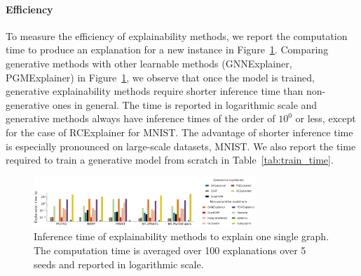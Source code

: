 \paragraph{Efficiency} To measure the efficiency of explainability methods, we report the computation time to produce an explanation for a new instance in Figure~\ref{fig:efficiency}. Comparing generative methods with other learnable methods (\eg GNNExplainer, PGMExplainer) in Figure~\ref{fig:efficiency}, we observe that once the model is trained, generative explainability methods require shorter inference time than non-generative ones in general. The time is reported in logarithmic scale and generative methods always have inference times of the order of $10^0$ or less, except for the case of RCExplainer for MNIST. The advantage of shorter inference time is especially pronounced on large-scale datasets, \eg MNIST. We also report the time required to train a generative model from scratch in Table~\ref{tab:train_time}. 
\begin{figure}[h!]
    \centering
    \includegraphics[width=0.75\textwidth]{submissions/Rex2023/figures/inference_time_bar_log.pdf}
    \caption{Inference time of explainability methods to explain one single graph. The computation time is averaged over 100 explanations over 5 seeds and reported in logarithmic scale.}
    \label{fig:efficiency}
\end{figure}
